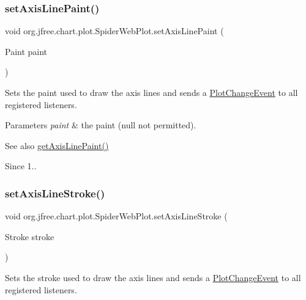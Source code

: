 \subsubsection{\texorpdfstring{set\+Axis\+Line\+Paint()}{setAxisLinePaint()}}
{\footnotesize\ttfamily void org.\+jfree.\+chart.\+plot.\+Spider\+Web\+Plot.\+set\+Axis\+Line\+Paint (\begin{DoxyParamCaption}\item[{Paint}]{paint }\end{DoxyParamCaption})}

Sets the paint used to draw the axis lines and sends a \mbox{\hyperlink{}{Plot\+Change\+Event}} to all registered listeners.


\begin{DoxyParams}{Parameters}
{\em paint} & the paint ({\ttfamily null} not permitted).\\
\hline
\end{DoxyParams}
\begin{DoxySeeAlso}{See also}
\mbox{\hyperlink{classorg_1_1jfree_1_1chart_1_1plot_1_1_spider_web_plot_a552604854e1b6d275f5dd2d94543ca7c}{get\+Axis\+Line\+Paint()}} 
\end{DoxySeeAlso}
\begin{DoxySince}{Since}
1.. 
\end{DoxySince}
\mbox{\label{classorg_1_1jfree_1_1chart_1_1plot_1_1_spider_web_plot_a9643dc83b765d2e02295a4f08369b5a4}} 
\subsubsection{\texorpdfstring{set\+Axis\+Line\+Stroke()}{setAxisLineStroke()}}
{\footnotesize\ttfamily void org.\+jfree.\+chart.\+plot.\+Spider\+Web\+Plot.\+set\+Axis\+Line\+Stroke (\begin{DoxyParamCaption}\item[{Stroke}]{stroke }\end{DoxyParamCaption})}

Sets the stroke used to draw the axis lines and sends a \mbox{\hyperlink{}{Plot\+Change\+Event}} to all registered listeners.



